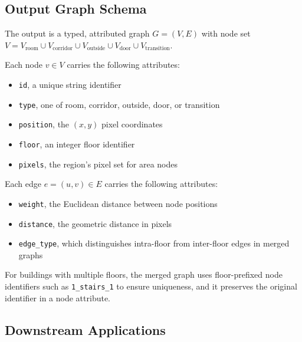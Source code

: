 \documentclass[manuscript,screen,review]{acmart}
\begin{document}
\subsection{Output Graph Schema}
\label{subsec:output}

The output is a typed, attributed graph $G = (V, E)$ with node set $V = V_{\text{room}} \cup V_{\text{corridor}} \cup V_{\text{outside}} \cup V_{\text{door}} \cup V_{\text{transition}}$.

Each node $v \in V$ carries the following attributes:
\begin{itemize}
    \item \texttt{id}, a unique string identifier
    \item \texttt{type}, one of room, corridor, outside, door, or transition
    \item \texttt{position}, the $(x, y)$ pixel coordinates
    \item \texttt{floor}, an integer floor identifier
    \item \texttt{pixels}, the region's pixel set for area nodes
\end{itemize}

Each edge $e = (u, v) \in E$ carries the following attributes:
\begin{itemize}
    \item \texttt{weight}, the Euclidean distance between node positions
    \item \texttt{distance}, the geometric distance in pixels
    \item \texttt{edge\_type}, which distinguishes intra-floor from inter-floor edges in merged graphs
\end{itemize}


For buildings with multiple floors, the merged graph uses floor-prefixed node identifiers such as \texttt{1\_stairs\_1} to ensure uniqueness, and it preserves the original identifier in a node attribute.

\subsection{Downstream Applications}
\label{subsec:applications}
\end{document}
